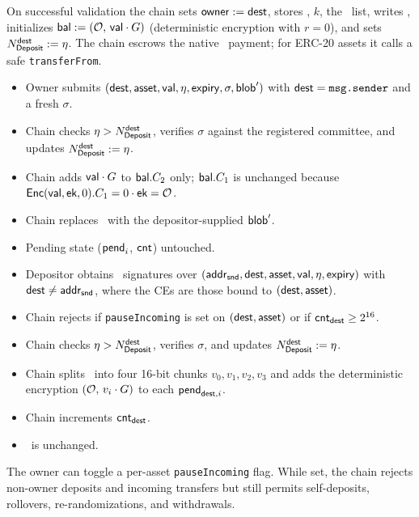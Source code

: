 On successful validation the chain sets $\mathsf{owner} := \mathsf{dest}$, stores \ek, $k$, the \CE\ list, writes \blob, initializes $\mathsf{bal} := (\mathcal{O},\, \mathsf{val} \cdot G)$ (deterministic encryption with $r{=}0$), and sets $N_\mathsf{Deposit}^\mathsf{dest} := \eta$.
The chain escrows the native \asset\ payment; for ERC-20 assets it calls a safe \texttt{transferFrom}.


%
\begin{itemize}[itemsep=.5pt]
    \item Owner submits $(\mathsf{dest}, \mathsf{asset}, \mathsf{val}, \eta, \mathsf{expiry}, \sigma, \mathsf{blob}')$ with $\mathsf{dest} = \texttt{msg.sender}$ and a fresh $\sigma$.
    \item Chain checks $\eta > N_\mathsf{Deposit}^\mathsf{dest}$, verifies $\sigma$ against the registered committee, and updates $N_\mathsf{Deposit}^\mathsf{dest} := \eta$.
    \item Chain adds $\mathsf{val} \cdot G$ to $\mathsf{bal}.C_2$ only; $\mathsf{bal}.C_1$ is unchanged because ${\mathsf{Enc}}(\mathsf{val}, \textsf{ek}, 0).C_1 = 0 \cdot \textsf{ek} = \mathcal{O}$.
    \item Chain replaces \blob\ with the depositor-supplied $\mathsf{blob}'$.
    \item Pending state ($\mathsf{pend}_i$, $\mathsf{cnt}$) untouched.
\end{itemize}

%
\begin{itemize}[itemsep=.5pt]
    \item Depositor obtains \CE\ signatures over $({\mathsf{addr}}_{\sf snd}, \mathsf{dest}, \mathsf{asset}, \mathsf{val}, \eta, \mathsf{expiry})$ with $\mathsf{dest} \ne {\ensuremath{\mathsf{addr}}}_{\sf snd}$, where the CEs are those bound to $(\mathsf{dest}, \mathsf{asset})$.
    \item Chain rejects if \texttt{pauseIncoming} is set on $(\mathsf{dest}, \mathsf{asset})$ or if $\mathsf{cnt}_\mathsf{dest} \ge 2^{16}$.
    \item Chain checks $\eta > N_\mathsf{Deposit}^\mathsf{dest}$, verifies $\sigma$, and updates $N_\mathsf{Deposit}^\mathsf{dest} := \eta$.
    \item Chain splits \val\ into four 16-bit chunks $v_0, v_1, v_2, v_3$ and adds the deterministic encryption $(\mathcal{O},\, v_i \cdot G)$ to each $\mathsf{pend}_{\mathsf{dest}, i}$.
    \item Chain increments $\mathsf{cnt}_\mathsf{dest}$.
    \item \blob\ is unchanged.
\end{itemize}

The owner can toggle a per-asset \texttt{pauseIncoming} flag.
While set, the chain rejects non-owner deposits and incoming transfers but still permits self-deposits, rollovers, re-randomizations, and withdrawals.
